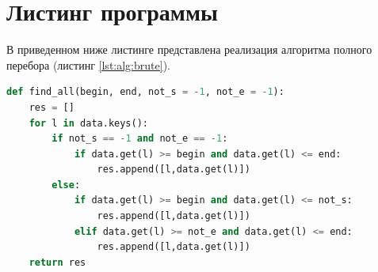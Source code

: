    \section{Листинг программы}
        В приведенном ниже листинге представлена реализация алгоритма полного перебора (листинг \ref{lst:alg:brute}).
        \par \text{           }
        \begin{lstlisting}[language=Python, label=lst:alg:brute, caption=Реализация алгоритма полного перебора]
def find_all(begin, end, not_s = -1, not_e = -1):
    res = []
    for l in data.keys():
        if not_s == -1 and not_e == -1:
            if data.get(l) >= begin and data.get(l) <= end:
                res.append([l,data.get(l)])
        else:
            if data.get(l) >= begin and data.get(l) <= not_s:
                res.append([l,data.get(l)])
            elif data.get(l) >= not_e and data.get(l) <= end:
                res.append([l,data.get(l)])
    return res
\end{lstlisting}

